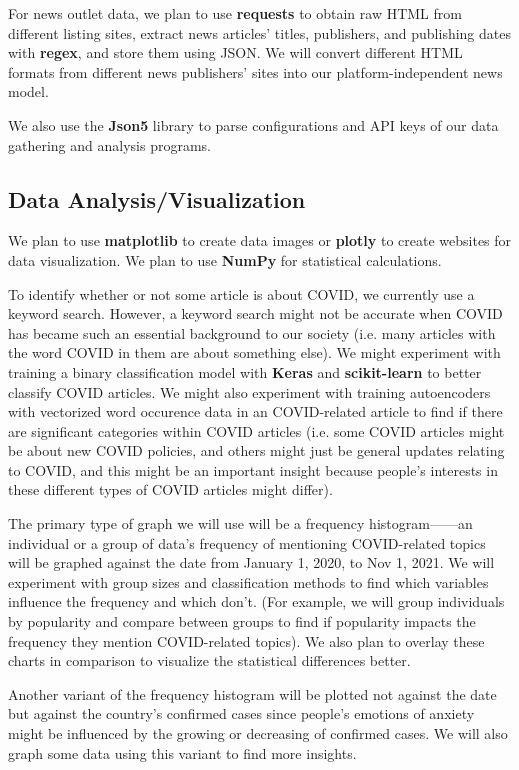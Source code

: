 \documentclass{article}
\begin{document}
    For news outlet data, we plan to use \textbf{requests} to obtain raw HTML from different listing sites, extract news articles’ titles, publishers, and publishing dates with \textbf{regex}, and store them using JSON. We will convert different HTML formats from different news publishers’ sites into our platform-independent news model.

    We also use the \textbf{Json5} library to parse configurations and API keys of our data gathering and analysis programs.

    \subsection*{Data Analysis/Visualization}
    \indent

    We plan to use \textbf{matplotlib} to create data images or \textbf{plotly} to create websites for data visualization. We plan to use \textbf{NumPy} for statistical calculations.

    To identify whether or not some article is about COVID, we currently use a keyword search. However, a keyword search might not be accurate when COVID has became such an essential background to our society (i.e. many articles with the word COVID in them are about something else). We might experiment with training a binary classification model with \textbf{Keras} and \textbf{scikit-learn} to better classify COVID articles. We might also experiment with training autoencoders with vectorized word occurence data in an COVID-related article to find if there are significant categories within COVID articles (i.e. some COVID articles might be about new COVID policies, and others might just be general updates relating to COVID, and this might be an important insight because people's interests in these different types of COVID articles might differ).

    The primary type of graph we will use will be a frequency histogram——an individual or a group of data’s frequency of mentioning COVID-related topics will be graphed against the date from January 1, 2020, to Nov 1, 2021. We will experiment with group sizes and classification methods to find which variables influence the frequency and which don’t. (For example, we will group individuals by popularity and compare between groups to find if popularity impacts the frequency they mention COVID-related topics). We also plan to overlay these charts in comparison to visualize the statistical differences better.

    Another variant of the frequency histogram will be plotted not against the date but against the country’s confirmed cases since people’s emotions of anxiety might be influenced by the growing or decreasing of confirmed cases. We will also graph some data using this variant to find more insights.
\end{document}
